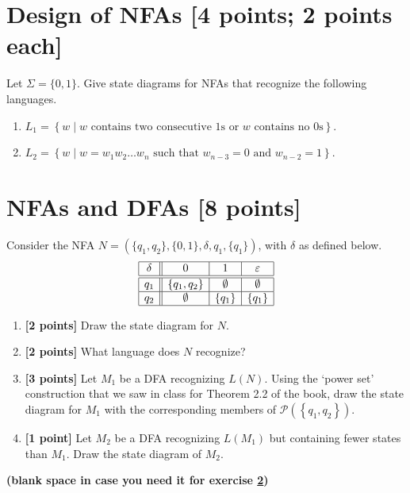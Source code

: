 \documentclass[letterpaper,11pt,twoside]{article}
\providecommand{\set}[1]{\ensuremath{\left\{#1\right\}}\xspace}
\providecommand{\powerset}[1]{\ensuremath{\mathcal{P}\left( #1\right)}\xspace}
\providecommand{\emptystring}{\ensuremath{\varepsilon}\xspace}
\begin{document}
\newpage
\section{Design of NFAs [4 points; 2 points each]}
Let $\Sigma = \{0, 1\}$. Give state diagrams for NFAs that recognize the following languages.
\begin{enumerate}[label=(\roman*)]
\item $L_1 = \set{w \mid \mbox{$w$ contains two consecutive 1s or $w$ contains no 0s}}$.
\item $L_2 = \set{w \mid \mbox{$w = w_1w_2\ldots w_n$ such that $w_{n-3} = 0$ and $w_{n-2} = 1$}}$.
\end{enumerate}



\newpage
\section{NFAs and DFAs [8 points]}\label{nfatodfa}
Consider the NFA $N = \left(\{q_1, q_2\}, \{0, 1\}, \delta, q_1, \{q_1\}\right)$, with $\delta$ as defined below.
\begin{displaymath}
\begin{array}{|c||c|c|c|}\hline
\delta &       0      &     1     & \emptystring \\\hline\hline
q_1    & \{q_1, q_2\} & \emptyset & \emptyset \\\hline
q_2    & \emptyset    & \{q_1\}   & \{q_1\}   \\\hline
\end{array}
\end{displaymath}
\begin{enumerate}[label=(\roman*)]
\item \textbf{[2 points]} Draw the state diagram for $N$.
\item \textbf{[2 points]} What language does $N$ recognize?
\item \textbf{[3 points]} Let $M_1$ be a DFA recognizing $L(N)$. 
Using the `power set' construction that we saw in class for Theorem 2.2 of the book, 
draw the state diagram for $M_1$ with the corresponding members of \powerset{\set{q_1, q_2}}.
\item \textbf{[1 point]} Let $M_2$ be a DFA recognizing $L(M_1)$ but containing fewer states than $M_1$. 
Draw the state diagram of $M_2$.
\end{enumerate}


\newpage
\begin{center}
\textbf{(blank space in case you need it for exercise \ref{nfatodfa})}
\end{center}
\end{document}
